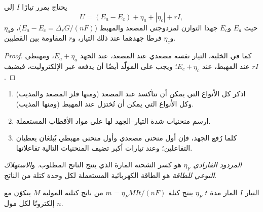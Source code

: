 \begin{proposition}\label{prop:b2:batteries-electrolysis:electrolysis-voltage}
يحتاج  يمرر تيارًا $I$ إلى
\[
  U = (E_a - E_c) + \eta_a + |\eta_c| + rI ,
\]
حيث $E_a$ و$E_c$ جهدا التوازن لمزدوجتي المصعد والمهبط
($E_a - E_c = \Delta_r G/(nF)$)، و$\eta_a$ و$\eta_c$ فرطا جهدهما عند ذلك
التيار، و$r$ المقاومة بين القطبين.
\end{proposition}

\begin{proof}
كما في الخلية، التيار نفسه مصعدي عند المصعد، عند الجهد $E_a +
\eta_a$، ومهبطي عند المهبط، عند $E_c + \eta_c$؛ ويجب على المولّد أيضًا
أن يدفعه عبر الإلكتروليت، فيضيف $rI$.
\end{proof}

\begin{method}\label{met:b2:batteries-electrolysis:predict-electrolysis}
\begin{enumerate}
  \item اذكر كل الأنواع التي يمكن أن تتأكسد عند المصعد (ومنها
        فلز المصعد والمذيب) وكل الأنواع التي يمكن أن تُختزل عند
        المهبط (ومنها المذيب).
  \item ارسم منحنيات شدة التيار--الجهد لها على مواد الأقطاب المستعملة.
  \item كلما رُفع الجهد، فإن أول منحنى مصعدي وأول منحنى مهبطي
        يُبلغان يعطيان التفاعلين؛ وعند تيارات أكبر تضيف المنحنيات التالية
        تفاعلاتها.
\end{enumerate}
\end{method}

\begin{definition}\label{def:b2:batteries-electrolysis:faradaic-efficiency}
\emph{المردود الفارادي} $\eta_F$  هو كسر الشحنة المارة الذي ينتج الناتج
المطلوب. و\emph{الاستهلاك النوعي للطاقة}
هو الطاقة الكهربائية المستعملة لكل وحدة كتلة من الناتج.
\end{definition}

\begin{proposition}\label{prop:b2:batteries-electrolysis:faraday-mass}
التيار $I$ المار مدة $t$  $\eta_F$ ينتج
كتلة $m = \eta_F MIt/(nF)$ من ناتج كتلته المولية $M$ يتكوّن مع $n$
إلكترونًا لكل مول.
\end{proposition}

